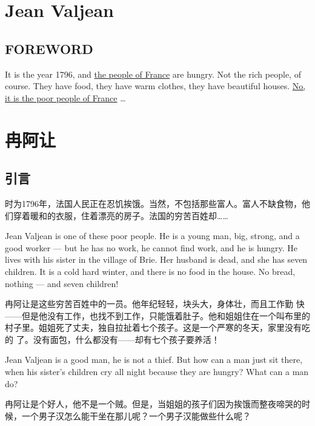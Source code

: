 \documentclass[fontset=ubuntu, zihao=5]{ctexart}
\begin{document}
\begin{paracol}{2}

  \section{Jean Valjean}

  \subsection*{FOREWORD}

  It is the year 1796, and \uline{the people of France} are hungry. Not the
  rich people, of course. They have food, they have warm clothes, they have
  beautiful houses. \uline{No, it is the poor people of France} \ldots{}

  \switchcolumn

  \section*{冉阿让}
  \subsection*{引言}

  时为1796年，法国人民正在忍饥挨饿。当然，不包括那些富人。富人不缺食物，他们穿着暖和的衣服，住着漂亮的房子。法国的穷苦百姓却……

  \switchcolumn*

  Jean Valjean is one of these poor people. He is a young man, big, strong,
  and a good worker --- but he has no work, he cannot find work, and he is
  hungry. He lives with his sister in the village of Brie. Her husband is
  dead, and she has seven children. It is a cold hard winter, and there is
  no food in the house. No bread, nothing --- and seven children!

  \switchcolumn
  冉阿让是这些穷苦百姓中的一员。他年纪轻轻，块头大，身体壮，而且工作勤
  快——但是他没有工作，也找不到工作，只能饿着肚子。他和姐姐住在一个叫布里的
  村子里。姐姐死了丈夫，独自拉扯着七个孩子。这是一个严寒的冬天，家里没有吃的
  了。没有面包，什么都没有——却有七个孩子要养活！

  \switchcolumn*

  Jean Valjean is a good man, he is not a thief. But how can a man just sit there, when his sister's children cry all night because they are hungry? What can a man do?

  \switchcolumn

  冉阿让是个好人，他不是一个贼。但是，当姐姐的孩子们因为挨饿而整夜啼哭的时候，一个男子汉怎么能干坐在那儿呢？一个男子汉能做些什么呢？


\end{paracol}
\end{document}
